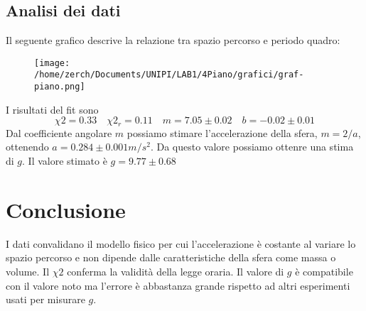 \documentclass[a4paper,10pt]{article}
\begin{document}
\subsection{Analisi dei dati}

Il seguente grafico descrive la relazione tra spazio percorso e periodo quadro:

 \begin{figure}[!htb]
\begin{center}
\texttt{[image: /home/zerch/Documents/UNIPI/LAB1/4Piano/grafici/graf-piano.png]}
\end{center}
\end{figure}
I risultati del fit sono 
\begin{equation}
\chi2=0.33 \quad \chi2_r=0.11 \quad m=7.05\pm0.02 \quad b=-0.02\pm 0.01
\end{equation}
Dal coefficiente angolare $m$ possiamo stimare l'accelerazione della sfera, $m=2/a$, ottenendo $a=0.284\pm0.001m/s^2$. 
Da questo valore possiamo ottenre una stima di $g$. Il valore stimato è $g=9.77\pm0.68$


\section{Conclusione}
I dati convalidano il modello fisico per cui l'accelerazione è costante al variare lo spazio percorso e non dipende dalle caratteristiche della sfera come massa o volume. 
Il $\chi2$ conferma la validità della legge oraria. Il valore di $g$ è compatibile con il valore noto ma l'errore è abbastanza grande rispetto ad altri esperimenti usati per misurare $g$.

\end{document}
